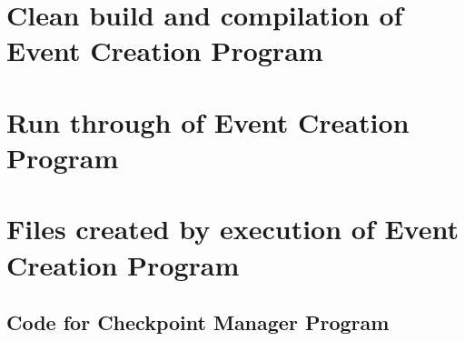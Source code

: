 \documentclass[a4paper,12pt]{article}
\begin{document}
\section{Clean build and compilation of Event Creation Program}

\section{Run through of Event Creation Program}

\section{Files created by execution of Event Creation Program}

\begin{landscape}
\section{Code for Checkpoint Manager Program}










\end{landscape}
\end{document}
